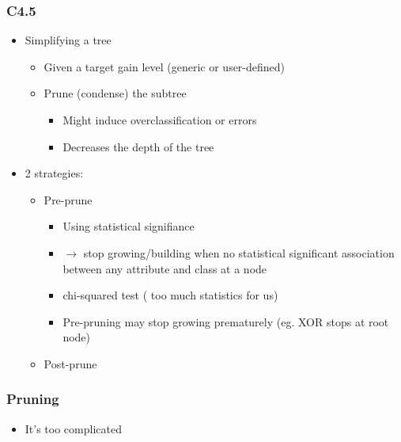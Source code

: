 \begin{frame}[allowframebreaks]
\frametitle{C4.5}
\begin{itemize}
\item Simplifying a tree
\vfill
\begin{itemize}
\item Given a target gain level (generic or user-defined)
\vfill
\item Prune (condense) the subtree
\vfill
\begin{itemize}
\item Might induce overclassification or errors
\vfill
\item Decreases the depth of the tree 
\vfill
\end{itemize}
\end{itemize}
\item 2 strategies:
\vfill
\begin{itemize}
\item Pre-prune
\vfill
\begin{itemize}
\item Using statistical signifiance
\vfill
\item $\rightarrow$ stop growing/building when no statistical significant association between any attribute and class at a node
\vfill
\item chi-squared test ( too much statistics for us)
\vfill
\item Pre-pruning may stop growing prematurely (eg. XOR stops at root node)
\vfill
\end{itemize}
\framebreak
\item Post-prune
\end{itemize}
\end{itemize}
\end{frame}


\begin{frame}
\frametitle{Pruning}
\begin{itemize}
\item It's too complicated
\end{itemize}
\end{frame}